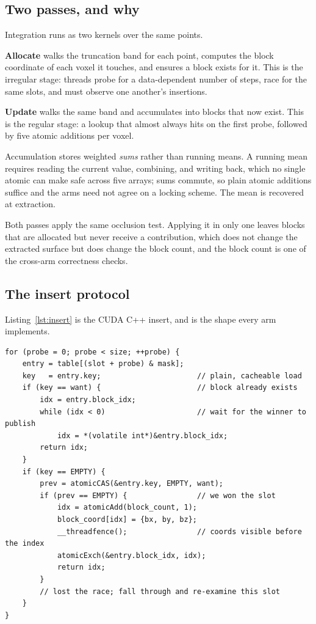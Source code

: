 \documentclass[11pt]{article}
\begin{document}
\subsection{Two passes, and why}

Integration runs as two kernels over the same points.

\textbf{Allocate} walks the truncation band for each point, computes the block
coordinate of each voxel it touches, and ensures a block exists for it. This is
the irregular stage: threads probe for a data-dependent number of steps, race
for the same slots, and must observe one another's insertions.

\textbf{Update} walks the same band and accumulates into blocks that now exist.
This is the regular stage: a lookup that almost always hits on the first probe,
followed by five atomic additions per voxel.

Accumulation stores weighted \emph{sums} rather than running means. A running
mean requires reading the current value, combining, and writing back, which no
single atomic can make safe across five arrays; sums commute, so plain atomic
additions suffice and the arms need not agree on a locking scheme. The mean is
recovered at extraction.

Both passes apply the same occlusion test. Applying it in only one leaves blocks
that are allocated but never receive a contribution, which does not change the
extracted surface but does change the block count, and the block count is one of
the cross-arm correctness checks.

\subsection{The insert protocol}

Listing~\ref{lst:insert} is the CUDA C++ insert, and is the shape every arm
implements.

\begin{lstlisting}[caption={The insert protocol. Both the probe loop and the
publication window shape the comparison in Section~\ref{sec:attribution}.},
label={lst:insert}]
for (probe = 0; probe < size; ++probe) {
    entry = table[(slot + probe) & mask];
    key   = entry.key;                      // plain, cacheable load
    if (key == want) {                      // block already exists
        idx = entry.block_idx;
        while (idx < 0)                     // wait for the winner to publish
            idx = *(volatile int*)&entry.block_idx;
        return idx;
    }
    if (key == EMPTY) {
        prev = atomicCAS(&entry.key, EMPTY, want);
        if (prev == EMPTY) {                // we won the slot
            idx = atomicAdd(block_count, 1);
            block_coord[idx] = {bx, by, bz};
            __threadfence();                // coords visible before the index
            atomicExch(&entry.block_idx, idx);
            return idx;
        }
        // lost the race; fall through and re-examine this slot
    }
}
\end{lstlisting}
\end{document}
